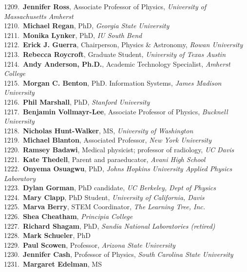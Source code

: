 1209.~{\bf Jennifer Ross}, Associate Professor of Physics, {\sl University of Massachusetts Amherst} \\
1210.~{\bf Michael Regan}, PhD, {\sl Georgia State University} \\
1211.~{\bf Monika Lynker}, PhD, {\sl IU South Bend} \\
1212.~{\bf Erick J. Guerra}, Chairperson, Physics \& Astronomy, {\sl Rowan University} \\
1213.~{\bf Rebecca Roycroft}, Graduate Student, {\sl University of Texas Austin} \\
1214.~{\bf Andy Anderson, Ph.D.}, Academic Technology Specialist, {\sl Amherst College} \\
1215.~{\bf Morgan C. Benton}, PhD. Information Systems, {\sl James Madison University} \\
1216.~{\bf Phil Marshall}, PhD, {\sl Stanford University} \\
1217.~{\bf Benjamin Vollmayr-Lee}, Associate Professor of Physics, {\sl Bucknell University} \\
1218.~{\bf Nicholas Hunt-Walker}, MS, {\sl University of Washington} \\
1219.~{\bf Michael Blanton}, Associated Professor, {\sl New York University} \\
1220.~{\bf Ramsey Badawi}, Medical physicist; professor of radiology, {\sl UC Davis} \\
1221.~{\bf Kate Thedell}, Parent and paraeducator, {\sl Avani High School} \\
1222.~{\bf Onyema Osuagwu}, PhD, {\sl Johns Hopkins University Applied Physics Laboratory} \\
1223.~{\bf Dylan Gorman}, PhD candidate, {\sl UC Berkeley, Dept of Physics} \\
1224.~{\bf Mary Clapp}, PhD Student, {\sl University of California, Davis} \\
1225.~{\bf Marva Berry}, STEM Coordinator, {\sl The Learning Tree, Inc.} \\
1226.~{\bf Shea Cheatham}, {\sl Principia College} \\
1227.~{\bf Richard Shagam}, PhD, {\sl Sandia National Laboratories (retired)} \\
1228.~{\bf Mark Schueler}, PhD \\
1229.~{\bf Paul Scowen}, Professor, {\sl Arizona State University} \\
1230.~{\bf Jennifer Cash}, Professor of Physics, {\sl South Carolina State University} \\
1231.~{\bf Margaret Edelman}, MS \\
